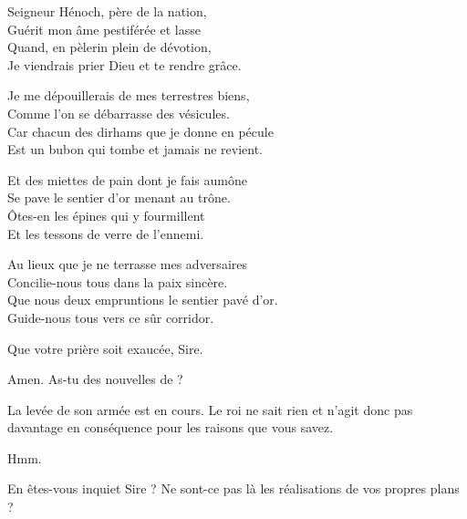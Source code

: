 \scene

\StageDirII{\elena, \alexas}\nopagebreak[4]
\nopagebreak[4]
\begin{drama}\nopagebreak[4]
  \elenaspeaks\nopagebreak[4]%
  \begin{minipage}[t]{\linewidth}
      Seigneur Hénoch, père de la nation,\\
      Guérit mon âme pestiférée et lasse\\
      Quand, en pèlerin plein de dévotion,\\
      Je viendrais prier Dieu et te rendre grâce.\vspace{1em}
      
      Je me dépouillerais de mes terrestres biens,\\
      Comme l’on se débarrasse des vésicules.\\
      Car chacun des dirhams que je donne en pécule\\
      Est un bubon qui tombe et jamais ne revient.\vspace{1em}
      
      Et des miettes de pain dont je fais aumône\\
      Se pave le sentier d’or menant au trône.\\
      Ôtes-en les épines qui y fourmillent\\
      Et les tessons de verre de l’ennemi.\vspace{1em}
      
      Au lieux que je ne terrasse mes adversaires\\
      Concilie-nous tous dans la paix sincère.\\
      Que nous deux empruntions le sentier pavé d’or.\\
      Guide-nous tous vers ce sûr corridor.
  \end{minipage}

  \alexasspeaks Que votre prière soit exaucée, Sire.

  \elenaspeaks Amen. As-tu des nouvelles de \general{} ?

  \alexasspeaks La levée de son armée est en cours. Le roi ne sait rien et n’agit donc pas davantage en conséquence pour les raisons que vous savez.

  \elenaspeaks {} Hmm.

  \alexasspeaks En êtes-vous inquiet Sire ? Ne sont-ce pas là les réalisations de vos propres plans ?


\end{drama}
